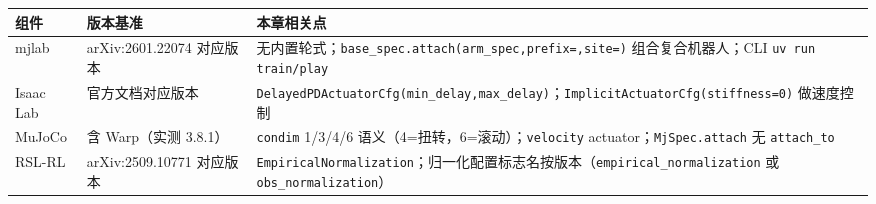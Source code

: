 \begin{center}
\small
\begin{tabular}{@{}lll@{}}
\toprule
组件 & 版本基准 & 本章相关点 \\
\midrule
mjlab & arXiv:2601.22074 对应版本 & 无内置轮式；\verb|base_spec.attach(arm_spec,prefix=,site=)| 组合复合机器人；CLI \verb|uv run train/play| \\
Isaac Lab & 官方文档对应版本 & \verb|DelayedPDActuatorCfg(min_delay,max_delay)|；\verb|ImplicitActuatorCfg(stiffness=0)| 做速度控制 \\
MuJoCo & 含 Warp（实测 3.8.1） & \verb|condim| 1/3/4/6 语义（4=扭转，6=滚动）；\verb|velocity| actuator；\verb|MjSpec.attach| 无 \verb|attach_to| \\
RSL-RL & arXiv:2509.10771 对应版本 & \verb|EmpiricalNormalization|；归一化配置标志名按版本（\verb|empirical_normalization| 或 \verb|obs_normalization|） \\
\bottomrule
\end{tabular}
\end{center}


